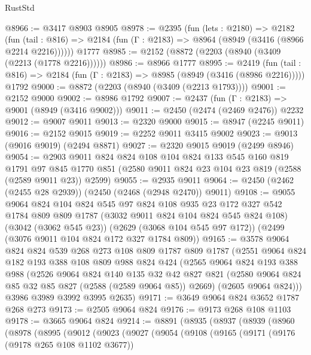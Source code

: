 \begin{lexlean}{RustStd}
\begin{coremodule}
@8966 := @3417 @8903 @8905
@8978 := @2395
    (fun (lets : @2180) =>
    @2182
      (fun (tail : @816) => @2184 (fun (Γ : @2183) => @8964 (@8949 (@3416 (@8966 @2214 @2216))))))
    @1777
@8985 := @2152 (@8872 (@2203 (@8940 (@3409 (@2213 (@1778 @2216))))))
@8986 := @8966 @1777
@8995 := @2419
    (fun (tail : @816) => @2184 (fun (Γ : @2183) => @8985 (@8949 (@3416 (@8986 @2216)))))
    @1792
@9000 := @8872 (@2203 (@8940 (@3409 (@2213 @1793))))
@9001 := @2152 @9000
@9002 := @8986 @1792
@9007 := @2437 (fun (Γ : @2183) => @9001 (@8949 (@3416 @9002)))
@9011 := @2450 (@2474 (@2469 @2476)) @2232
@9012 := @9007 @9011
@9013 := @2320 @9000
@9015 := @8947 (@2245 @9011)
@9016 := @2152 @9015
@9019 := @2252 @9011 @3415 @9002
@9023 := @9013 (@9016 @9019) (@2494 @8871)
@9027 := @2320 @9015 @9019 (@2499 @8946)
@9054 := @2903
    @9011
    @824
    @824
    @108
    @104
    @824
    @133
    @545
    @160
    @819
    @1791
    @97
    @845
    @1770
    @851
    (@2580 @9011 @824 @23 @104 @23 @819 (@2588 (@2589 @9011 @23)) @2599)
@9055 := @2935 @9011
@9064 := @2450 (@2462 (@2455 @28 @2939)) (@2450 (@2468 (@2948 @2470)) @9011)
@9108 := @9055
    @9064
    @824
    @104
    @824
    @545
    @97
    @824
    @108
    @935
    @23
    @172
    @327
    @542
    @1784
    @809
    @809
    @1787
    (@3032 @9011 @824 @104 @824 @545 @824 @108)
    (@3042 (@3062 @545 @23))
    (@2629 (@3068 @104 @545 @97 @172))
    (@2499 (@3076 @9011 @104 @824 @172 @327 @1784 @809))
@9165 := @3578
    @9064
    @824
    @824
    @539
    @268
    @273
    @108
    @809
    @1787
    @809
    @1787
    (@2551
      @9064
      @824
      @182
      @193
      @388
      @108
      @809
      @988
      @824
      @424
      (@2565
        @9064
        @824
        @193
        @388
        @988
        (@2526
          @9064
          @824
          @140
          @135
          @32
          @42
          @827
          @821
          (@2580 @9064 @824 @85 @32 @85 @827 (@2588 (@2589 @9064 @85)) @2669)
          (@2605 @9064 @824)))
      @3986
      @3989
      @3992
      @3995
      @2635)
@9171 := @3649 @9064 @824 @3652 @1787 @268 @273
@9173 := @2505 @9064 @824
@9176 := @9173 @268 @108 @1103
@9178 := @3665 @9064 @824
@9214 := @8891
    (@8935
      (@8937
        (@8939
          (@8960
            (@8978
              (@8995
                (@9012
                  (@9023
                    (@9027
                      (@9054
                        (@9108
                          (@9165
                            (@9171
                              (@9176 (@9178 @265 @108 @1102 @3677))

\end{coremodule}
\end{lexlean}
